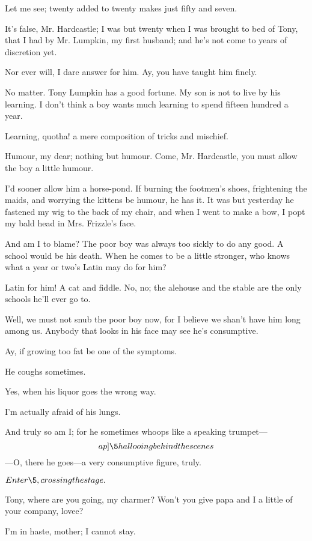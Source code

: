 \documentclass{book}
\begin{document}
\3  Let me see; twenty added to twenty makes just fifty and
seven.

\7  It's false, Mr. Hardcastle; I was but twenty when I
was brought to bed of Tony, that I had by Mr. Lumpkin, my first
husband; and he's not come to years of discretion yet.

\3  Nor ever will, I dare answer for him.  Ay, you have
taught him finely.

\7  No matter.  Tony Lumpkin has a good fortune.  My son
is not to live by his learning.  I don't think a boy wants much
learning to spend fifteen hundred a year.

\3  Learning, quotha! a mere composition of tricks and
mischief.

\7  Humour, my dear; nothing but humour.  Come, Mr.
Hardcastle, you must allow the boy a little humour.

\3  I'd sooner allow him a horse-pond.  If burning the
footmen's shoes, frightening the maids, and worrying the kittens be
humour, he has it.  It was but yesterday he fastened my wig to the back
of my chair, and when I went to make a bow, I popt my bald head in Mrs.
Frizzle's face.

\7  And am I to blame?  The poor boy was always too
sickly to do any good.  A school would be his death.  When he comes to
be a little stronger, who knows what a year or two's Latin may do for
him?

\3  Latin for him!  A cat and fiddle.  No, no; the alehouse
and the stable are the only schools he'll ever go to.

\7  Well, we must not snub the poor boy now, for I
believe we shan't have him long among us.  Anybody that looks in his
face may see he's consumptive.

\3  Ay, if growing too fat be one of the symptoms.

\7  He coughs sometimes.

\3  Yes, when his liquor goes the wrong way.

\7  I'm actually afraid of his lungs.

\3  And truly so am I; for he sometimes whoops like a
speaking trumpet---\[ap]\5 hallooing behind the scenes\]---O, there he
goes---a very consumptive figure, truly.


\(Enter \5, crossing the stage.\)


\7  Tony, where are you going, my charmer?  Won't you
give papa and I a little of your company, lovee?

\5  I'm in haste, mother; I cannot stay.
\end{document}
